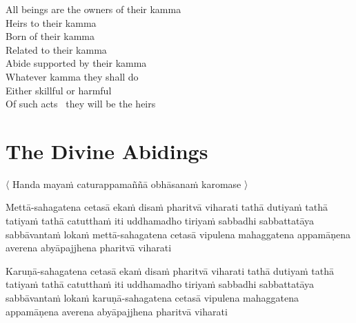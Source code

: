 \begin{english-verses}
  All beings are the owners of their kamma\hyperlink{endnote95-appendix}{\hypertarget{endnote95-body}{}}\\
  Heirs to their kamma\\
  Born of their kamma\\
  Related to their kamma\\
  Abide supported by their kamma\\
  Whatever kamma they shall do\\
  Either skillful or harmful\\
  Of such acts \breathmark\ they will be the heirs\\
\end{english-verses}

\suttaRef{[AN 3.65 \& 5.57]}


\section{The Divine Abidings}
\label{divine-abidings}

\begin{leader}
  〈 Handa mayaṁ caturappamaññā obhāsanaṁ karomase 〉
\end{leader}

\begin{pali-hang}
Mettā-sahagatena cetasā ekaṁ disaṁ pharitvā viharati tathā dutiyaṁ tathā tatiyaṁ tathā catutthaṁ iti uddhamadho tiriyaṁ sabbadhi sabbattatāya sabbāvantaṁ lokaṁ mettā-sahagatena cetasā vipulena mahaggatena appamāṇena averena abyāpajjhena pharitvā viharati
\end{pali-hang}

\medskip

\begin{pali-hang}
Karuṇā-sahagatena cetasā ekaṁ disaṁ pharitvā viharati tathā dutiyaṁ tathā tatiyaṁ tathā catutthaṁ iti uddhamadho tiriyaṁ sabbadhi sabbattatāya sabbāvantaṁ lokaṁ karuṇā-sahagatena cetasā vipulena mahaggatena appamāṇena averena abyāpajjhena pharitvā viharati
\end{pali-hang}

